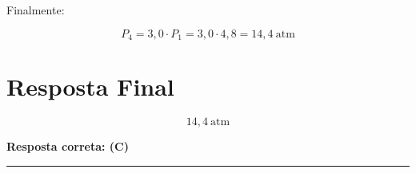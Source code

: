\documentclass[a4paper,12pt]{article}
\begin{document}
\begin{flushleft}
Finalmente:

\begin{equation}
P_4 = 3{,}0 \cdot P_1 = 3{,}0 \cdot 4{,}8 = 14{,}4 \ \text{atm}
\end{equation}

\section*{Resposta Final}

\[
\boxed{14{,}4 \ \text{atm}}
\]

\textbf{Resposta correta: \colorbox{green!50}{(C)}}

\end{flushleft}

\noindent\rule{\linewidth}{0.6pt}\\
\end{document}
